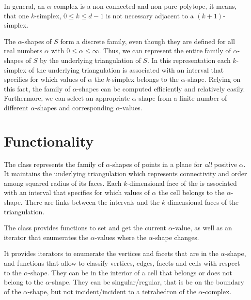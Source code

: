 In general, an $\alpha$-complex is a non-connected and non-pure polytope, it
means, that one $k$-simplex, $0 \leq k \leq d-1$ is not necessary adjacent to
a $(k+1)$-simplex.

The $\alpha$-shapes of $S$ form a discrete family, even though they
are defined for all real numbers $\alpha$ with $0 \leq \alpha
\leq \infty$. Thus, we can represent the entire family of $\alpha$-shapes
of $S$ by the underlying triangulation of $S$. In this representation
each $k$-simplex of the underlying triangulation is associated with an
interval that specifies for which values of $\alpha$ the $k$-simplex
belongs to the $\alpha$-shape. Relying on this fact, the family of
$\alpha$-shapes can be computed efficiently and relatively
easily. Furthermore, we can select an appropriate $\alpha$-shape from a
finite number of different $\alpha$-shapes and corresponding
$\alpha$-values.




\section{Functionality \label{I1_SectAlpha_Shape_3}}

The class  represents the family of
$\alpha$-shapes of points in a plane for {\em all} positive
$\alpha$. It maintains the underlying triangulation  which
represents connectivity and order among squared radius of its faces. Each
$k$-dimensional face of the  is associated with an interval
that specifies for which values of $\alpha$ the cell belongs to the
$\alpha$-shape. There are links between the intervals and the
$k$-dimensional faces of the triangulation.


The class  provides functions to set and
get the current $\alpha$-value, as well as an iterator that enumerates
the $\alpha$-values where the $\alpha$-shape changes.


It provides iterators to enumerate the vertices and facets that are in
the $\alpha$-shape, and functions that allow to classify vertices,
edges, facets and cells with respect to the $\alpha$-shape. They can be in
the interior of a cell that belongs or does not belong to the $\alpha$-shape.
They can be singular/regular, that is be on the boundary of the $\alpha$-shape,
but not incident/incident to a tetrahedron of the $\alpha$-complex.

